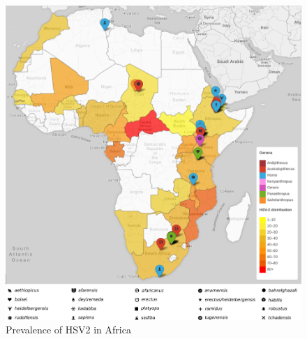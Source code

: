 \documentclass[fleqn,10pt]{wlscirep}
\begin{document}
\begin{figure}[!h]
	\centering
	\includegraphics[width=\textwidth]{figs/fossils}
	\caption{Prevalence of HSV2 in Africa}
	\label{fig:hsv2}   
\end{figure}  
\end{document}
